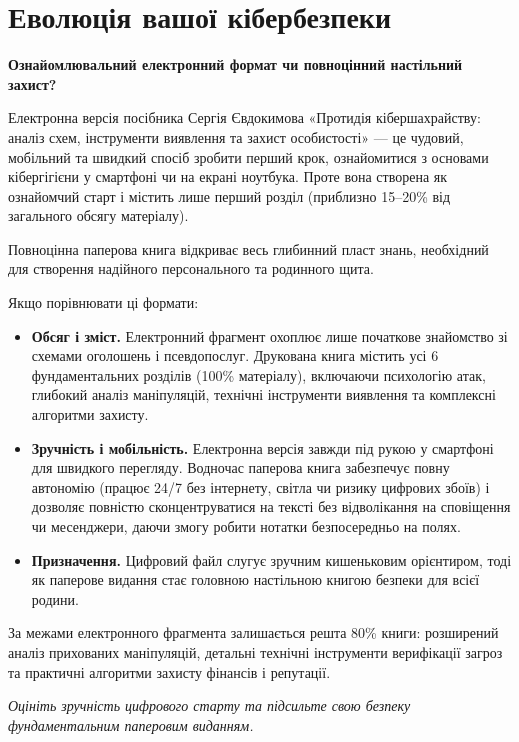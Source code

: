 \chapter*{Еволюція вашої кібербезпеки}

\textbf{Ознайомлювальний електронний формат чи повноцінний настільний захист?}

Електронна версія посібника Сергія Євдокимова «Протидія кібершахрайству: аналіз схем, інструменти виявлення та захист особистості» — це чудовий, мобільний та швидкий спосіб зробити перший крок, ознайомитися з основами кібергігієни у смартфоні чи на екрані ноутбука. Проте вона створена як ознайомчий старт і містить лише перший розділ (приблизно 15–20\% від загального обсягу матеріалу).

Повноцінна паперова книга відкриває весь глибинний пласт знань, необхідний для створення надійного персонального та родинного щита. 

\vspace{0.3cm}

Якщо порівнювати ці формати:

\begin{itemize}[leftmargin=1.5em, itemsep=4pt]
    \item \textbf{Обсяг і зміст.} Електронний фрагмент охоплює лише початкове знайомство зі схемами оголошень і псевдопослуг. Друкована книга містить усі 6 фундаментальних розділів (100\% матеріалу), включаючи психологію атак, глибокий аналіз маніпуляцій, технічні інструменти виявлення та комплексні алгоритми захисту.
    \item \textbf{Зручність і мобільність.} Електронна версія завжди під рукою у смартфоні для швидкого перегляду. Водночас паперова книга забезпечує повну автономію (працює 24/7 без інтернету, світла чи ризику цифрових збоїв) і дозволяє повністю сконцентруватися на тексті без відволікання на сповіщення чи месенджери, даючи змогу робити нотатки безпосередньо на полях.
    \item \textbf{Призначення.} Цифровий файл слугує зручним кишеньковим орієнтиром, тоді як паперове видання стає головною настільною книгою безпеки для всієї родини.
\end{itemize}

За межами електронного фрагмента залишається решта 80\% книги: розширений аналіз прихованих маніпуляцій, детальні технічні інструменти верифікації загроз та практичні алгоритми захисту фінансів і репутації. 

\vspace{0.3cm}
\noindent\textit{Оцініть зручність цифрового старту та підсильте свою безпеку фундаментальним паперовим виданням.}
